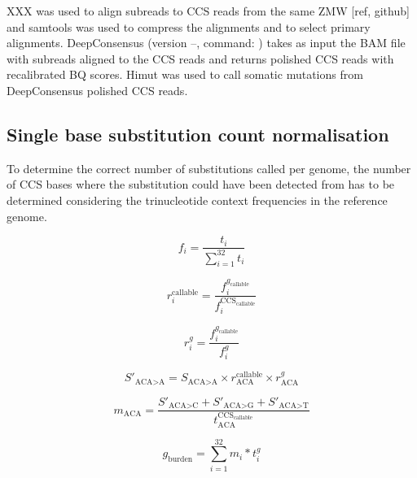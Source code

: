 XXX was used to align subreads to CCS reads from the same ZMW [ref, github] and samtools was used to compress the alignments and to select primary alignments. DeepConsensus (version --, command: ) \cite{Baid2022-or} takes as input the BAM file with subreads aligned to the CCS reads and returns polished CCS reads with recalibrated BQ scores. Himut was used to call somatic mutations from DeepConsensus polished CCS reads. 

\subsection{Single base substitution count normalisation}
To determine the correct number of substitutions called per genome, the number of CCS bases where the substitution could have been detected from has to be determined considering the trinucleotide context frequencies in the reference genome.

\begin{equation}
f_{i} = \frac{t_{i}}{\sum^{32}_{i=1} t_{i}}
\end{equation}

\begin{equation}
r^{\text{callable}}_{i} = \frac{f^{g_{\text{callable}}}_{i}}{f^{\text{CCS}_{\text{callable}}}_{i}}
\end{equation}

\begin{equation}
r^{g}_{i} = \frac{f^{g_{\text{callable}}}_{i}}{f^{g}_{i}}
\end{equation}

\begin{equation}
S'_{\text{ACA>A}} = S_{\text{ACA>A}} \times r^{\text{callable}}_{\text{ACA}} \times r^{g}_{\text{ACA}}
\end{equation}

\begin{equation}
m_{\text{ACA}} = \frac{S'_{\text{ACA>C}} + S'_{\text{ACA>G}} + S'_{\text{ACA>T}}}{t^{\text{CCS}_{\text{callable}}}_{\text{ACA}}} 
\end{equation}

\begin{equation}
g_{\text{burden}} = \sum^{32}_{i=1} m_{i} * t^{g}_{i}
\end{equation}




